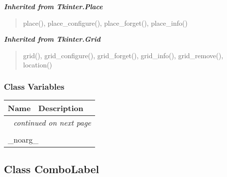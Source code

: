 \large{\textbf{\textit{Inherited from Tkinter.Place}}}

\begin{quote}
place(), place\_configure(), place\_forget(), place\_info()
\end{quote}

\large{\textbf{\textit{Inherited from Tkinter.Grid}}}

\begin{quote}
grid(), grid\_configure(), grid\_forget(), grid\_info(), grid\_remove(), location()
\end{quote}


  \subsubsection{Class Variables}

    \vspace{-1cm}
\hspace{\varindent}\begin{longtable}{|p{\varnamewidth}|p{\vardescrwidth}|l}
\cline{1-2}
\cline{1-2} \centering \textbf{Name} & \centering \textbf{Description}& \\
\cline{1-2}
\endhead\cline{1-2}\multicolumn{3}{r}{\small\textit{continued on next page}}\\\endfoot\cline{1-2}
\endlastfoot\multicolumn{2}{|l|}{\textit{Inherited from Tkinter.Misc}}\\
\multicolumn{2}{|p{\varwidth}|}{\raggedright \_noarg\_}\\
\cline{1-2}
\end{longtable}



\subsection{Class ComboLabel}

